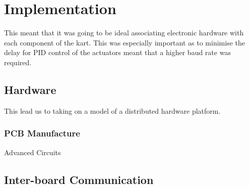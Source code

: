 \section{Implementation}
  This meant that it was going to be ideal associating electronic hardware with
  each component of the kart. This was especially important as to minimise the
  delay for PID control of the actuators meant that a higher baud rate was
  required. 

\subsection{Hardware}
  This lead us to taking on a model of a distributed hardware platform.

\subsubsection{PCB Manufacture}
  Advanced Circuits

\subsection{Inter-board Communication}
